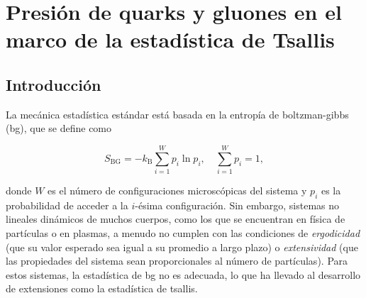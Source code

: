\chapter{Presión de quarks y gluones en el marco de la estadística de Tsallis}\label{ch-Tsallis}


\pagestyle{fancy}
\fancyhf{} %
\fancyhead[LE]{\nouppercase{\textit{\rightmark}}} %
\fancyhead[RO]{\nouppercase{\textit{\rightmark}}} %

\section{Introducción}

La mecánica estadística estándar está basada en la entropía de \Gls{boltzman-gibbs} (\gls{bg}), que se define como

\begin{equation}
{S}_{\mathrm{BG}} = - {k}_{\mathrm{B}} \sum_{i=1}^{W} {p}_{i} \ln {p}_{i}, \quad \sum_{i=1}^{W} {p}_{i} = 1,
\end{equation}

donde \( W \) es el número de configuraciones microscópicas del sistema y \( {p}_{i} \) es la probabilidad de acceder a la \( i \)-ésima configuración. Sin embargo, sistemas no lineales dinámicos de muchos cuerpos, como los que se encuentran en física de partículas o en plasmas, a menudo no cumplen con las condiciones de \emph{ergodicidad} (que su valor esperado sea igual a su promedio a largo plazo) o \emph{extensividad} (que las propiedades del sistema sean proporcionales al número de partículas). Para estos sistemas, la estadística de \gls{bg} no es adecuada, lo que ha llevado al desarrollo de extensiones como la estadística de \Gls{tsallis}.

